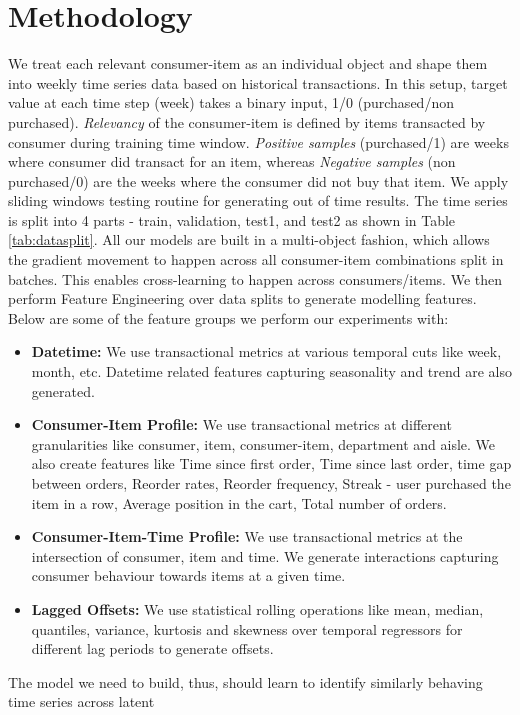 \section{Methodology}
\label{sec:methodology}
We treat each relevant consumer-item as an individual object and shape them into weekly time series data
based on historical transactions. In this setup, target value at each time step (week) takes a binary input, 1/0 
(purchased/non purchased). \emph{Relevancy} of the consumer-item is defined by items transacted by consumer during training 
time window. \emph{Positive samples} (purchased/1) are weeks where consumer did transact for an item, whereas 
\emph{Negative samples} (non purchased/0) are the weeks where the consumer did not buy that item.
We apply sliding windows testing routine for generating
out of time results. The time series is split into 4 parts - train, validation, 
test1, and test2 as shown in Table \ref{tab:datasplit}. All our models are built in a multi-object 
fashion, which allows the gradient movement to happen across all consumer-item combinations split in batches. This enables 
cross-learning to happen across consumers/items. We then perform Feature Engineering over data splits to generate
modelling features. Below are some of the feature groups we perform our experiments with:
\begin{itemize}
\item {\bf Datetime:} We use transactional metrics at various temporal cuts like week, month, etc.
Datetime related features capturing seasonality and trend are also generated.
\item {\bf Consumer-Item Profile:} We use transactional metrics at different granularities like consumer, item,
consumer-item, department and aisle. We also create features like Time since first order, 
Time since last order, time gap between orders, Reorder rates, Reorder frequency, 
Streak - user purchased the item in a row, Average position in the cart, Total number of orders.
\item {\bf Consumer-Item-Time Profile:} We use transactional metrics at the intersection of consumer, item and time.
We generate interactions capturing consumer behaviour towards items at a given time.
\item {\bf Lagged Offsets:} We use statistical rolling operations like mean, median, quantiles, variance, 
kurtosis and skewness over temporal regressors for different lag periods to generate offsets.
\end{itemize}
The model we need to build, thus, should learn to identify similarly behaving time series across latent
